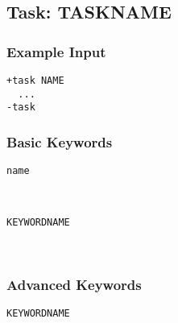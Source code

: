 \subsection{Task: TASKNAME} %

\subsubsection{Example Input}
\begin{lstlisting}
+task NAME
  ...
-task
\end{lstlisting}
\subsubsection{Basic Keywords}
\begin{description}
    \item [\texttt{name}]\hfill \\

    \item [\texttt{KEYWORDNAME}]\hfill \\
\end{description}
    
\subsubsection{Advanced Keywords}
\begin{description}
    \item [\texttt{KEYWORDNAME}]\hfill \\
    
\end{description}

